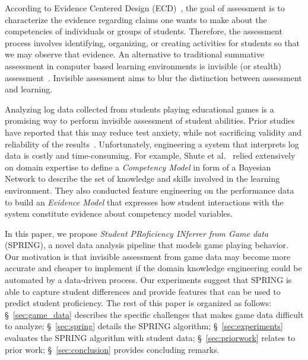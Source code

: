 \documentclass{sigchi}
\def\algname{SPRING\xspace}
\begin{document}
	According to Evidence Centered Design (ECD)~\cite{mislevy2012design}, the goal of assessment is to characterize the evidence regarding claims one wants to make about the competencies of individuals or groups of students.
	Therefore, the assessment process involves identifying, organizing, or creating activities for students so that we may observe that evidence.
	An alternative to traditional summative assessment in computer based learning environments is invisible (or stealth) assessment~\cite{shute2013stealth}.
	Invisible assessment aims to blur the distinction between assessment and learning.
	
	
	Analyzing log data collected from students playing educational games is a  promising way to perform  invisible assessment of student abilities.
	Prior studies have reported that this may reduce test anxiety, while not sacrificing validity and reliability of the results~\cite{shute2008you}.
	Unfortunately, engineering a system that interprets log data is costly and time-consuming.
	For example, Shute et al.~\cite{shute2013stealth, shute2009melding} relied extensively on domain expertise to define a \textit{Competency Model} in form of a Bayesian Network to describe the set of knowledge and skills involved in the learning environment.
	They also conducted feature engineering on the performance data to build an \textit{Evidence Model} that expresses how student interactions with the system constitute evidence about competency model variables.
	
	
	In this paper, we propose \textit{Student PRoficiency INferrer from Game data} (SPRING), a novel data analysis pipeline that models game playing behavior.
	Our motivation is that invisible assessment from game data may become more accurate and cheaper to implement if the domain knowledge engineering could be automated by a data-driven process.
	Our experiments suggest that \algname is able to capture student differences and provide features that can be used to predict student proficiency.
	The rest of this paper is organized as follows:
	\S~\ref{sec:game_data}   describes the specific challenges that makes game data  difficult to analyze;
	\S~\ref{sec:spring} details the SPRING algorithm;
	\S~\ref{sec:experiments} evaluates the SPRING algorithm with student data;
	\S~\ref{sec:priorwork} relates to prior work;
	\S~\ref{sec:conclusion} provides concluding remarks.
	
\end{document}
